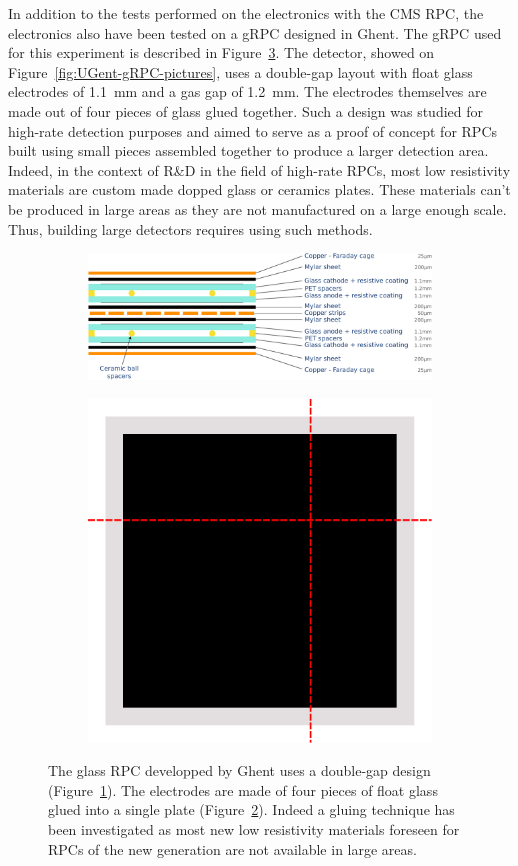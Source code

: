 	In addition to the tests performed on the electronics with the CMS RPC, the electronics also have been tested on a gRPC designed in Ghent. The gRPC used for this experiment is described in Figure~\ref{fig:UGent-gRPC-design}. The detector, showed on Figure~\ref{fig:UGent-gRPC-pictures}, uses a double-gap layout with float glass electrodes of \SI{1.1}{mm} and a gas gap of \SI{1.2}{mm}. The electrodes themselves are made out of four pieces of glass glued together. Such a design was studied for high-rate detection purposes and aimed to serve as a proof of concept for RPCs built using small pieces assembled together to produce a larger detection area. Indeed, in the context of R\&D in the field of high-rate RPCs, most low resistivity materials are custom made dopped glass or ceramics plates. These materials can't be produced in large areas as they are not manufactured on a large enough scale. Thus, building large detectors requires using such methods.
	 
	\begin{figure}[H]
		\begin{subfigure}{\linewidth}
		    \centering
			\includegraphics[width = .8\linewidth]{fig/chapt6/gRPC-design.pdf}
			\caption{\label{fig:UGent-gRPC-design:A}}
		\end{subfigure}
		\begin{subfigure}{\linewidth}
		    \centering
			\includegraphics[width = .4\linewidth]{fig/chapt6/gRPC-assembly.pdf}
			\caption{\label{fig:UGent-gRPC-design:B}}
		\end{subfigure}
		\caption{\label{fig:UGent-gRPC-design} The glass RPC developped by Ghent uses a double-gap design (Figure~\ref{fig:UGent-gRPC-design:A}). The electrodes are made of four pieces of float glass glued into a single plate (Figure~\ref{fig:UGent-gRPC-design:B}). Indeed a gluing technique has been investigated as most new low resistivity materials foreseen for RPCs of the new generation are not available in large areas.}
    \end{figure}
	 

